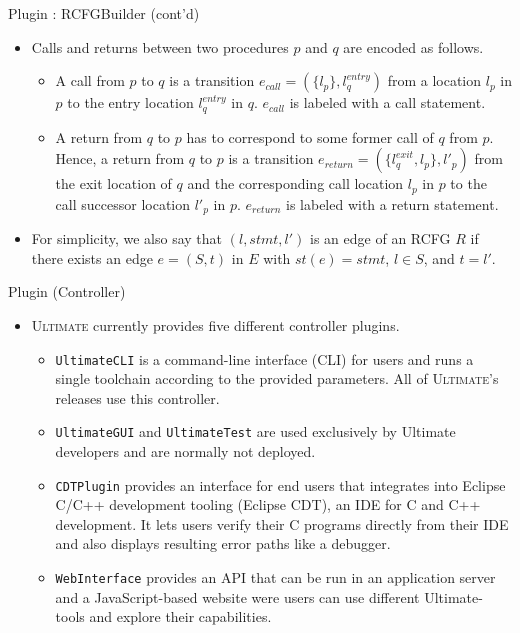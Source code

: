 \documentclass[12pt]{beamer}
\newcommand{\code}[1]{\texttt{#1}}
\newcommand{\ultimate}{\textsc{Ultimate }}
\newcommand{\ultimates}{\textsc{Ultimate}'s }
\begin{document}
\begin{frame}{Plugin : RCFGBuilder (cont'd)}
	\begin{itemize}
		\item Calls and returns between two procedures $p$ and $q$ are encoded as follows.
		\begin{itemize}
			\item A call from $p$ to $q$ is a transition $e_{call} = (\{l_{p}\}, l^{entry}_{q})$ from a location $l_{p}$ in $p$ to the entry location $l^{entry}_{q}$ in $q$. $e_{call}$ is labeled with a call statement.
			\item A return from $q$ to $p$ has to correspond to some former call of $q$ from $p$. Hence, a return from $q$ to $p$ is a transition $e_{return} = (\{l^{exit}_{q}, l_{p}\}, l'_{p})$ from the exit location of $q$ and the corresponding call location $l_{p}$ in $p$ to the call successor location $l'_{p}$ in $p$. $e_{return}$ is labeled with a return statement.
		\end{itemize}
		\item For simplicity, we also say that $(l, stmt, l′)$ is an edge of an RCFG $R$ if there
		exists an edge $e = (S, t)$ in $E$ with $st(e) = stmt$, $l \in S$, and $t = l'$.
	\end{itemize}
\end{frame}

\begin{frame}{Plugin (Controller)}
	\begin{itemize}
		\item \ultimate currently provides five different controller plugins.
		\begin{itemize}
			\item \code{UltimateCLI} is a command-line interface (CLI) for users and runs a single toolchain according to the provided parameters. All of \ultimates releases use this controller.
			\item \code{UltimateGUI} and \code{UltimateTest} are used exclusively by Ultimate developers and are normally not deployed.
			\item \code{CDTPlugin} provides an interface for end users that integrates into Eclipse C/C++ development tooling (Eclipse CDT), an IDE for C and C++ development. It lets users verify their C programs directly from their IDE and also displays resulting error paths like a debugger.
			\item \code{WebInterface} provides an API that can be run in an application server and a JavaScript-based website were users can use different Ultimate-tools and explore their capabilities.
		\end{itemize}
	\end{itemize}
\end{frame}
\end{document}
